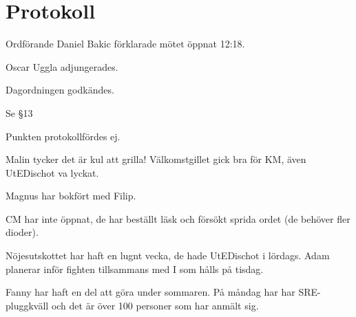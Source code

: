 \documentclass[10pt]{article}
\def\mo{Daniel Bakic}
\begin{document}
\section*{Protokoll}
\begin{paragrafer}
	Ordförande {\mo} förklarade mötet öppnat 12:18.
		
	{\valavmo}
		
	{\valavms}
		
	{\valavj}
		
	{\tosg}
		
	Oscar Uggla adjungerades.
		
	Dagordningen godkändes.
		
	Se \S13	

	\begin{fyllnadsval} %
	\end{fyllnadsval}
		
	\begin{paragrafer}
		Punkten protokollfördes ej.
				
		Malin tycker det är kul att grilla! 
		Välkomstgillet gick bra för KM, även UtEDischot va lyckat.

		Magnus har bokfört med Filip.

		CM har inte öppnat, de har beställt läsk och försökt 
		sprida ordet (de behöver fler dioder).

		Nöjesutskottet har haft en lugnt vecka, de hade 
		UtEDischot i lördags. Adam planerar inför fighten 
		tillsammans med I som hålls på tisdag.

		Fanny har haft en del att göra under sommaren. 
		På måndag har har SRE-pluggkväll och det är över 
		100 personer som har anmält sig.


\end{paragrafer}
\end{paragrafer}
\end{document}
